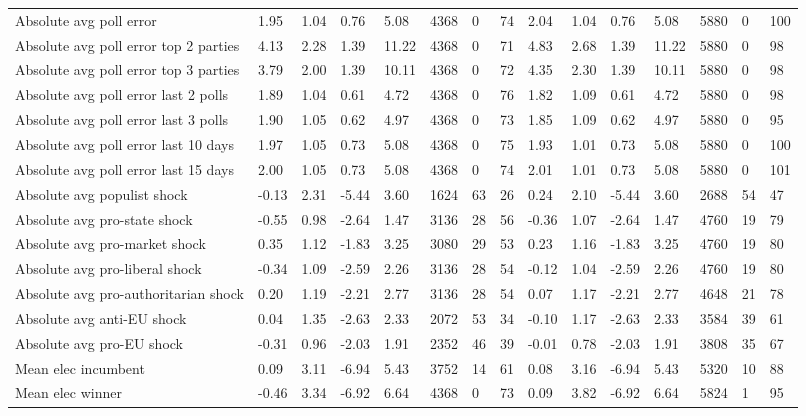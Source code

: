 \begin{longtable}{lllllllllllllll}
Absolute avg poll error & 1.95 & 1.04 & 0.76 & 5.08 & 4368 & 0 & 74 & 2.04 & 1.04 & 0.76 & 5.08 & 5880 & 0 & 100\\
Absolute avg poll error top 2 parties & 4.13 & 2.28 & 1.39 & 11.22 & 4368 & 0 & 71 & 4.83 & 2.68 & 1.39 & 11.22 & 5880 & 0 & 98\\
Absolute avg poll error top 3 parties & 3.79 & 2.00 & 1.39 & 10.11 & 4368 & 0 & 72 & 4.35 & 2.30 & 1.39 & 10.11 & 5880 & 0 & 98\\
\addlinespace
Absolute avg poll error last 2 polls & 1.89 & 1.04 & 0.61 & 4.72 & 4368 & 0 & 76 & 1.82 & 1.09 & 0.61 & 4.72 & 5880 & 0 & 98\\
Absolute avg poll error last 3 polls & 1.90 & 1.05 & 0.62 & 4.97 & 4368 & 0 & 73 & 1.85 & 1.09 & 0.62 & 4.97 & 5880 & 0 & 95\\
Absolute avg poll error last 10 days & 1.97 & 1.05 & 0.73 & 5.08 & 4368 & 0 & 75 & 1.93 & 1.01 & 0.73 & 5.08 & 5880 & 0 & 100\\
Absolute avg poll error last 15 days & 2.00 & 1.05 & 0.73 & 5.08 & 4368 & 0 & 74 & 2.01 & 1.01 & 0.73 & 5.08 & 5880 & 0 & 101\\
Absolute avg populist shock & -0.13 & 2.31 & -5.44 & 3.60 & 1624 & 63 & 26 & 0.24 & 2.10 & -5.44 & 3.60 & 2688 & 54 & 47\\
\addlinespace
Absolute avg pro-state shock & -0.55 & 0.98 & -2.64 & 1.47 & 3136 & 28 & 56 & -0.36 & 1.07 & -2.64 & 1.47 & 4760 & 19 & 79\\
Absolute avg pro-market shock & 0.35 & 1.12 & -1.83 & 3.25 & 3080 & 29 & 53 & 0.23 & 1.16 & -1.83 & 3.25 & 4760 & 19 & 80\\
Absolute avg pro-liberal shock & -0.34 & 1.09 & -2.59 & 2.26 & 3136 & 28 & 54 & -0.12 & 1.04 & -2.59 & 2.26 & 4760 & 19 & 80\\
Absolute avg pro-authoritarian shock & 0.20 & 1.19 & -2.21 & 2.77 & 3136 & 28 & 54 & 0.07 & 1.17 & -2.21 & 2.77 & 4648 & 21 & 78\\
Absolute avg anti-EU shock & 0.04 & 1.35 & -2.63 & 2.33 & 2072 & 53 & 34 & -0.10 & 1.17 & -2.63 & 2.33 & 3584 & 39 & 61\\
\addlinespace
Absolute avg pro-EU shock & -0.31 & 0.96 & -2.03 & 1.91 & 2352 & 46 & 39 & -0.01 & 0.78 & -2.03 & 1.91 & 3808 & 35 & 67\\
Mean elec incumbent & 0.09 & 3.11 & -6.94 & 5.43 & 3752 & 14 & 61 & 0.08 & 3.16 & -6.94 & 5.43 & 5320 & 10 & 88\\
Mean elec winner & -0.46 & 3.34 & -6.92 & 6.64 & 4368 & 0 & 73 & 0.09 & 3.82 & -6.92 & 6.64 & 5824 & 1 & 95\\

\end{longtable}

